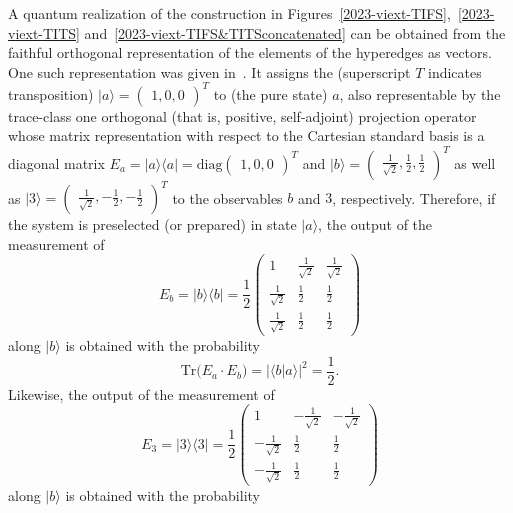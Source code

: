 \documentclass[%
 superscriptaddress,
  preprint,
 showpacs,
 showkeys,
 nofootinbib,
  amsmath,amssymb,
 pra,
  longbibliography,
  floatfix,
 ]{revtex4-2}
\theoremstyle{definition}
\begin{document}
A quantum realization of the construction  in Figures~\ref{2023-viext-TIFS},~\ref{2023-viext-TITS} and~\ref{2023-viext-TIFS&TITSconcatenated}
can be obtained from the faithful orthogonal representation of the elements of the hyperedges as vectors.
One such representation was given in~\cite[Table~I]{2018-minimalYIYS}.
It assigns the  (superscript $T$ indicates transposition)
$\vert a \rangle = \begin{pmatrix}1,0,0\end{pmatrix}^T$ to (the pure state) $a$,
also representable by the trace-class one orthogonal (that is, positive, self-adjoint) projection operator
whose matrix representation with respect to the Cartesian standard basis
is a diagonal matrix
$E_a=\vert a \rangle \langle a \vert = \text{diag}\begin{pmatrix} 1,0,0 \end{pmatrix}^T$
and
$\vert b \rangle = \begin{pmatrix}\frac{1}{\sqrt{2}},\frac{1}{2},\frac{1}{2}\end{pmatrix}^T$
as well as
$\vert 3 \rangle = \begin{pmatrix}\frac{1}{\sqrt{2}},-\frac{1}{2},-\frac{1}{2}\end{pmatrix}^T$
to the observables $b$ and $3$, respectively.
Therefore, if the system is preselected (or prepared) in state $\vert a \rangle$, the output of the
measurement of
\begin{equation*}
E_b=\vert b \rangle \langle b \vert =  \frac{1}{2}
\begin{pmatrix}
1&\frac{1}{\sqrt{2}}&\frac{1}{\sqrt{2}} \\
\frac{1}{\sqrt{2}}&\frac{1}{2}&\frac{1}{2} \\
\frac{1}{\sqrt{2}}&\frac{1}{2}&\frac{1}{2}
\end{pmatrix}
\end{equation*}
along  $\vert b \rangle$
 is obtained with the probability
\begin{equation*}
\text{Tr}\big(E_a \cdot E_b \big) = \vert \langle b \vert a \rangle \vert^2 = \frac12.
\end{equation*}
Likewise, the output of the
measurement of
\begin{equation*}
E_3=\vert 3 \rangle \langle 3 \vert =  \frac{1}{2}
\begin{pmatrix}
1&-\frac{1}{\sqrt{2}}&-\frac{1}{\sqrt{2}} \\
-\frac{1}{\sqrt{2}}&\frac{1}{2}&\frac{1}{2} \\
-\frac{1}{\sqrt{2}}&\frac{1}{2}&\frac{1}{2}
\end{pmatrix}
\end{equation*}
along  $\vert b \rangle$
 is obtained with the probability
\end{document}
